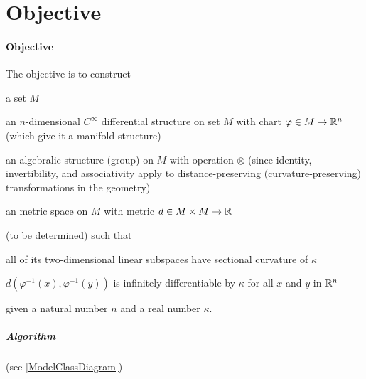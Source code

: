 \documentclass[stu, babel, american, biblatex, a4paper, draftall]{apa7}
\begin{document}
\section{Objective}
\paragraph{Objective}\label{Objective}
The objective is to construct
\begin{APAenumerate}
    \item a set $M$
    \item an $n$-dimensional $C^\infty$ differential structure on set $M$ with chart $\varphi\in M\to\mathbb{R}^n$ (which give it a manifold structure)
    \item an algebralic structure (group) on $M$ with operation $\otimes$ (since identity, invertibility, and associativity apply to distance-preserving (curvature-preserving) transformations in the geometry)
    \item an metric space on $M$ with metric $d\in M\times M\to\mathbb{R}$
\end{APAenumerate}
(to be determined)
such that
\begin{APAitemize}
    \item all of its two-dimensional linear subspaces have sectional curvature of $\kappa$
    \item $d\left(\varphi^{-1}\left(x\right), \varphi^{-1}\left(y\right)\right)$ is infinitely differentiable by $\kappa$ for all $x$ and $y$ in $\mathbb{R}^n$
\end{APAitemize}
given a natural number $n$ and a real number $\kappa$.

\subparagraph{Algorithm}\label{ModelAbstractClass}
(see \cref{ModelClassDiagram})
\end{document}
